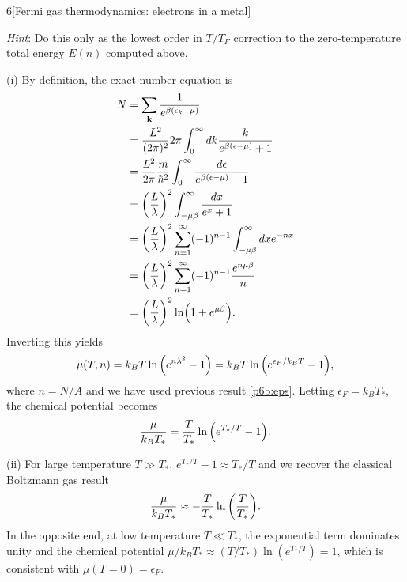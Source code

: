 \documentclass[12pt]{article}
\begin{document}
\begin{problem}{6}[Fermi gas thermodynamics: electrons in a metal]
\begin{enumerate}[label=(\roman*)]
    \textit{Hint}: Do this only as the lowest order in $T/T_F$ correction to the
    zero-temperature total energy $E(n)$ computed above.
\end{enumerate}
\begin{solution}
(i) By definition, the exact number equation is
\begin{align}
    N
    &=\sum_{\vb{k}}\frac1{e^{\beta(\epsilon_k-\mu)}}\notag\\
    &=\frac{L^2}{(2\pi)^2}2\pi\int_0^\infty dk
    \frac{k}{e^{\beta(\epsilon-\mu)}+1}\\
    &=\frac{L^2}{2\pi}\frac{m}{\hbar^2}\int_0^\infty\frac{d\epsilon}{e^{\beta(\epsilon-\mu)}+1}\notag\\
    &=\qty(\frac{L}{\lambda})^2\int_{-\mu\beta}^\infty \frac{dx}{e^x+1}\notag\\
    &=\qty(\frac{L}{\lambda})^2\sum_{n=1}^\infty(-1)^{n-1}\int_{-\mu\beta}^\infty
    dxe^{-nx}\notag\\
    &=\qty(\frac{L}{\lambda})^2\sum_{n=1}^\infty
    (-1)^{n-1}\frac{e^{n\mu\beta}}{n}\notag\\
    &=\qty(\frac{L}{\lambda})^2\ln(1+e^{\mu\beta}).
\end{align}
Inverting this yields
\begin{equation}
    \mu(T,n)=k_BT\ln\qty(e^{n\lambda^2}-1)
    =k_BT\ln\qty(e^{\epsilon_F/k_BT}-1), 
\end{equation}
where $n=N/A$ and we have used previous result \eqref{p6b:eps}. Letting
$\epsilon_F=k_BT_\ast$, the chemical potential becomes
\begin{equation}
    \frac{\mu}{k_BT_\ast}=\frac{T}{T_\ast}\ln\qty(e^{T_\ast/T}-1). 
\end{equation}

(ii) For large temperature $T\gg T_\ast$, $e^{T_\ast/T}-1\approx T_\ast/T$ and
we recover the classical Boltzmann gas result
\begin{equation}
    \frac{\mu}{k_BT_\ast}\approx -\frac{T}{T_\ast}\ln\qty(\frac{T}{T_\ast}). 
\end{equation}
In the opposite end, at low temperature $T\ll T_\ast$, the exponential term
dominates unity and the chemical potential $\mu/k_BT_\ast\approx
(T/T_\ast)\ln(e^{T_\ast/T})=1$, which is consistent with $\mu(T=0)=\epsilon_F$.


\end{solution}
\end{problem}
\end{document}
